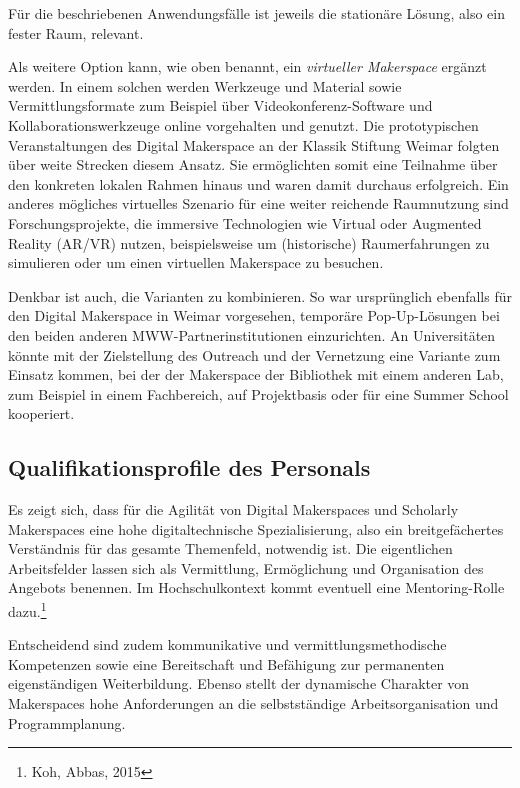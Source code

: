 \documentclass[a4paper,
fontsize=11pt,
oneside,
numbers=noperiodatend,
parskip=half-,
bibliography=totoc,
final
]{scrartcl}
\begin{document}
Für die beschriebenen Anwendungsfälle ist jeweils die stationäre Lösung,
also ein fester Raum, relevant.

Als weitere Option kann, wie oben benannt, ein \emph{virtueller
Makerspace} ergänzt werden. In einem solchen werden Werkzeuge und
Material sowie Vermittlungsformate zum Beispiel über
Videokonferenz-Software und Kollaborationswerkzeuge online vorgehalten
und genutzt. Die prototypischen Veranstaltungen des Digital Makerspace
an der Klassik Stiftung Weimar folgten über weite Strecken diesem
Ansatz. Sie ermöglichten somit eine Teilnahme über den konkreten lokalen
Rahmen hinaus und waren damit durchaus erfolgreich. Ein anderes
mögliches virtuelles Szenario für eine weiter reichende Raumnutzung sind
Forschungsprojekte, die immersive Technologien wie Virtual oder
Augmented Reality (AR/VR) nutzen, beispielsweise um (historische)
Raumerfahrungen zu simulieren oder um einen virtuellen Makerspace zu
besuchen.

Denkbar ist auch, die Varianten zu kombinieren. So war ursprünglich
ebenfalls für den Digital Makerspace in Weimar vorgesehen, temporäre
Pop-Up-Lösungen bei den beiden anderen MWW-Partnerinstitutionen
einzurichten. An Universitäten könnte mit der Zielstellung des Outreach
und der Vernetzung eine Variante zum Einsatz kommen, bei der der
Makerspace der Bibliothek mit einem anderen Lab, zum Beispiel in einem
Fachbereich, auf Projektbasis oder für eine Summer School kooperiert.

\hypertarget{qualifikationsprofile-des-personals}{%
\subsection{Qualifikationsprofile des
Personals}\label{qualifikationsprofile-des-personals}}

Es zeigt sich, dass für die Agilität von Digital Makerspaces und
Scholarly Makerspaces eine hohe digitaltechnische Spezialisierung, also
ein breitgefächertes Verständnis für das gesamte Themenfeld, notwendig
ist. Die eigentlichen Arbeitsfelder lassen sich als Vermittlung,
Ermöglichung und Organisation des Angebots benennen. Im Hochschulkontext
kommt eventuell eine Mentoring-Rolle dazu.\footnote{Koh, Abbas, 2015}

Entscheidend sind zudem kommunikative und vermittlungsmethodische
Kompetenzen sowie eine Bereitschaft und Befähigung zur permanenten
eigenständigen Weiterbildung. Ebenso stellt der dynamische Charakter von
Makerspaces hohe Anforderungen an die selbstständige Arbeitsorganisation
und Programmplanung.
\end{document}
